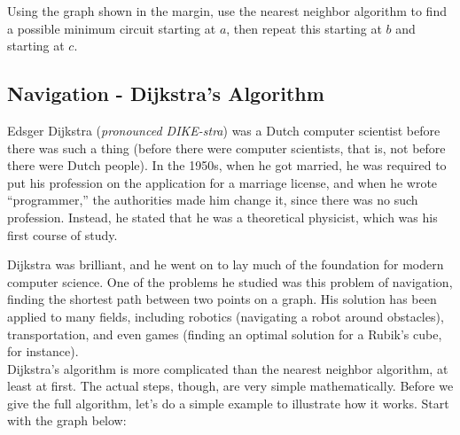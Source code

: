 \begin{trynolabel}
Using the graph shown in the margin, use the nearest neighbor algorithm to find a possible minimum circuit starting at $a$, then repeat this starting at $b$ and starting at $c$.
\end{trynolabel}
\pagebreak

\subsection{Navigation - Dijkstra's Algorithm}
Edsger Dijkstra (\emph{pronounced DIKE-stra}) was a Dutch computer scientist before there was such a thing (before there were computer scientists, that is, not before there were Dutch people).  In the 1950s, when he got married, he was required to put his profession on the application for a marriage license, and when he wrote ``programmer,'' the authorities made him change it, since there was no such profession.  Instead, he stated that he was a theoretical physicist, which was his first course of study.

Dijkstra was brilliant, and he went on to lay much of the foundation for modern computer science.  One of the problems he studied was this problem of navigation, finding the shortest path between two points on a graph.  His solution has been applied to many fields, including robotics (navigating a robot around obstacles), transportation, and even games (finding an optimal solution for a Rubik's cube, for instance).\\

Dijkstra's algorithm is more complicated than the nearest neighbor algorithm, at least at first.  The actual steps, though, are very simple mathematically.  Before we give the full algorithm, let's do a simple example to illustrate how it works.  Start with the graph below:
\begin{center}
\end{center}

